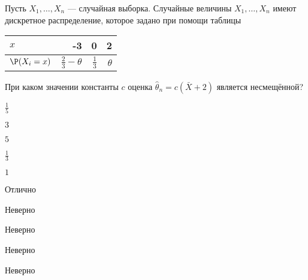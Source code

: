 
\begin{question}
Пусть \(X_1, \ldots , X_n\) --- случайная выборка. Случайные величины
\(X_1, \ldots, X_n\) имеют дискретное распределение, которое задано при
помощи таблицы

\begin{center}
\begin{tabular}{lrrr} \toprule
$x$  & -3 & 0 & 2 \\
\midrule
$\P(X_i=x)$ & $\frac{2}{3} - \theta$ & $\frac{1}{3}$ & $\theta$\\
\bottomrule
\end{tabular}
\end{center}

При каком значении константы \(c\) оценка
\(\hat{\theta}_n = c (\bar{X} + 2)\) является несмещённой?
\begin{answerlist}
  \item \(\frac{1}{5}\)
  \item \(3\)
  \item \(5\)
  \item \(\frac{1}{3}\)
  \item \(1\)
\end{answerlist}
\end{question}

\begin{solution}
\begin{answerlist}
  \item Отлично
  \item Неверно
  \item Неверно
  \item Неверно
  \item Неверно
\end{answerlist}
\end{solution}

